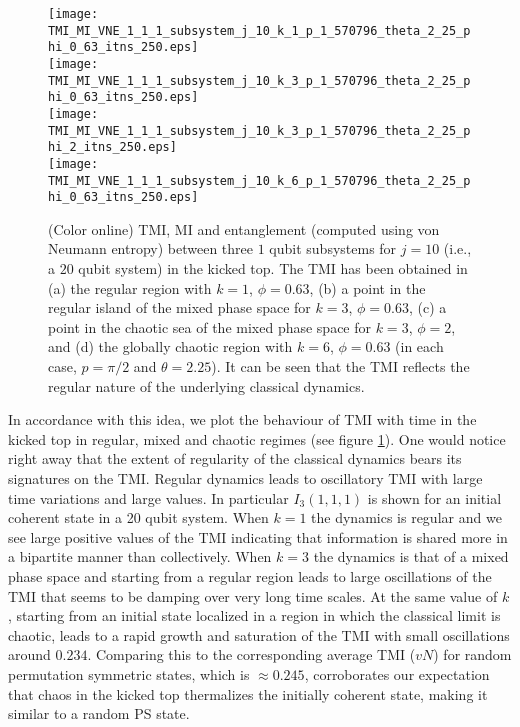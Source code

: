 \documentclass[pre,aps,showpacs,showkeys,twocolumn]{revtex4-1}
\theoremstyle{definition}
\theoremstyle{remark}
\begin{document}
\begin{figure}[!htpb]
    \texttt{[image: TMI\_MI\_VNE\_1\_1\_1\_subsystem\_j\_10\_k\_1\_p\_1\_570796\_theta\_2\_25\_phi\_0\_63\_itns\_250.eps]}
    \\
    \texttt{[image: TMI\_MI\_VNE\_1\_1\_1\_subsystem\_j\_10\_k\_3\_p\_1\_570796\_theta\_2\_25\_phi\_0\_63\_itns\_250.eps]}
    \\
    \texttt{[image: TMI\_MI\_VNE\_1\_1\_1\_subsystem\_j\_10\_k\_3\_p\_1\_570796\_theta\_2\_25\_phi\_2\_itns\_250.eps]}
    \\
    \texttt{[image: TMI\_MI\_VNE\_1\_1\_1\_subsystem\_j\_10\_k\_6\_p\_1\_570796\_theta\_2\_25\_phi\_0\_63\_itns\_250.eps]}
    \caption{(Color online) TMI, MI and entanglement (computed using von Neumann entropy) between three $1$ qubit subsystems for $j = 10$ (i.e., a $20$ qubit system) in the kicked top. The TMI has been obtained in (a) the regular region with $k = 1$, $\phi = 0.63$, (b) a point in the regular island of the mixed phase space for $k = 3$, $\phi = 0.63$, (c) a point in the chaotic sea of the mixed phase space for $k = 3$, $\phi = 2$, and (d) the globally chaotic region with $k = 6$, $\phi = 0.63$ (in each case, $p = \pi/2$ and $\theta = 2.25$). It can be seen that the TMI reflects the regular nature of the underlying classical dynamics.}
    \label{fig:tmi_with_time}
\end{figure}

In accordance with this idea, we plot the behaviour of TMI with time in the kicked top in regular, mixed and chaotic regimes (see figure \ref{fig:tmi_with_time}). One would notice right away that the extent of regularity of the classical dynamics bears its signatures on the TMI. 
Regular dynamics leads to oscillatory TMI with large time variations and large values. In particular $I_3(1,1,1)$ is shown for an initial coherent state in a 20 qubit system. When $k=1$ the dynamics is regular and we see large positive values of the TMI indicating that information is shared more in a bipartite manner than collectively. When $k=3$ the dynamics is that of a mixed phase space and starting from a regular region leads to large oscillations of the TMI that seems to be damping over very long time scales. At the same value of $k$, starting from an initial state localized in a region in which the  classical limit is chaotic, leads to a rapid growth and saturation of the TMI with small oscillations around $0.234$. Comparing this to the corresponding average TMI ($vN$) for random permutation symmetric states, which is  $\approx 0.245$, corroborates our expectation that chaos in the kicked top thermalizes the initially coherent state, making it similar to a random PS state. 
\end{document}

